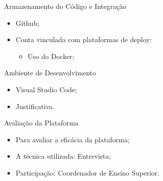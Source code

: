 \begin{frame}{Armazenamento do Código e Integração}
    \begin{itemize}
        \item Github; \vspace{0.5cm}
        \item Conta vinculada com plataformas de deploy: \vspace{0.5cm}
              \begin{itemize}
                  \item Uso do Docker; \vspace{0.5cm}
              \end{itemize}
    \end{itemize}
\end{frame}

\begin{frame}{Ambiente de Desenvolvimento}
    \begin{itemize}
        \item Visual Studio Code; \vspace{0.5cm}
        \item Justificativa. \vspace{0.5cm}
    \end{itemize}
\end{frame}

\begin{frame}{Avaliação da Plataforma}
    \begin{itemize}
        \item Para avaliar a eficácia da plataforma; \vspace{0.5cm}
        \item A técnica utilizada: Entrevista; \vspace{0.5cm}
        \item Participação: Coordenador de Ensino Superior. \vspace{0.5cm}
    \end{itemize}
\end{frame}

